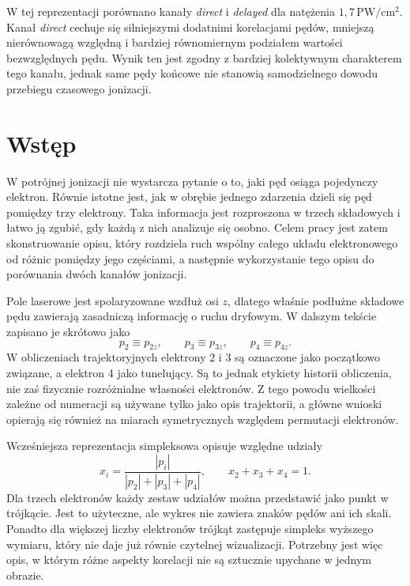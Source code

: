 \documentclass[12pt,letterpaper,oneside]{report}
\numberwithin{equation}{chapter}
\numberwithin{figure}{chapter}
\numberwithin{table}{chapter}
\newcommand{\direct}{\textit{direct}}
\newcommand{\delayed}{\textit{delayed}}
\begin{document}
W tej reprezentacji porównano kanały \direct{} i \delayed{} dla natężenia
\(1{,}7\,\mathrm{PW/cm^2}\). Kanał \direct{} cechuje się silniejszymi
dodatnimi korelacjami pędów, mniejszą nierównowagą względną i bardziej
równomiernym podziałem wartości bezwzględnych pędu. Wynik ten jest zgodny
z bardziej kolektywnym charakterem tego kanału, jednak same pędy końcowe
nie stanowią samodzielnego dowodu przebiegu czasowego jonizacji.

\chapter{Wstęp}

W potrójnej jonizacji nie wystarcza pytanie o to, jaki pęd osiąga
pojedynczy elektron. Równie istotne jest, jak w obrębie jednego zdarzenia
dzieli się pęd pomiędzy trzy elektrony. Taka informacja jest rozproszona
w trzech składowych i łatwo ją zgubić, gdy każdą z nich analizuje się
osobno. Celem pracy jest zatem skonstruowanie opisu, który rozdziela ruch
wspólny całego układu elektronowego od różnic pomiędzy jego częściami, a
następnie wykorzystanie tego opisu do porównania dwóch kanałów jonizacji.

Pole laserowe jest spolaryzowane wzdłuż osi \(z\), dlatego właśnie
podłużne składowe pędu zawierają zasadniczą informację o ruchu dryfowym.
W dalszym tekście zapisano je skrótowo jako
\begin{equation}
p_2\equiv p_{2z},\qquad p_3\equiv p_{3z},\qquad p_4\equiv p_{4z}.
\label{eq:longitudinal-momenta}
\end{equation}
W obliczeniach trajektoryjnych elektrony 2 i 3 są oznaczone jako
początkowo związane, a elektron 4 jako tunelujący. Są to jednak etykiety
historii obliczenia, nie zaś fizycznie rozróżnialne własności elektronów.
Z tego powodu wielkości zależne od numeracji są używane tylko jako opis
trajektorii, a główne wnioski opierają się również na miarach symetrycznych
względem permutacji elektronów.

Wcześniejsza reprezentacja simpleksowa opisuje względne udziały
\begin{equation}
x_i=\frac{|p_i|}{|p_2|+|p_3|+|p_4|},\qquad x_2+x_3+x_4=1.
\label{eq:shares}
\end{equation}
Dla trzech elektronów każdy zestaw udziałów można przedstawić jako punkt
w trójkącie. Jest to użyteczne, ale wykres nie zawiera znaków pędów ani
ich skali. Ponadto dla większej liczby elektronów trójkąt zastępuje
simpleks wyższego wymiaru, który nie daje już równie czytelnej
wizualizacji. Potrzebny jest więc opis, w którym różne aspekty korelacji
nie są sztucznie upychane w jednym obrazie.
\end{document}
